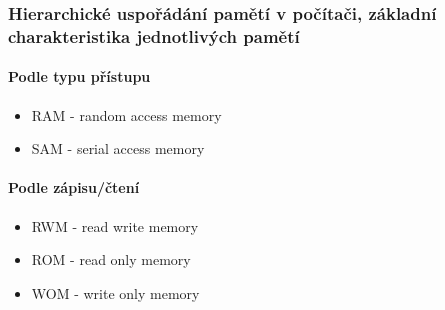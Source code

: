 \documentclass[10pt,a4paper]{article}
\begin{document}
\subsubsection{Hierarchické uspořádání pamětí v počítači, základní charakteristika jednotlivých pamětí}
\paragraph{Podle typu přístupu}
\begin{itemize}
\item RAM - random access memory
\item SAM - serial access memory
\end{itemize}

\paragraph{Podle zápisu/čtení}
\begin{itemize}
\item RWM - read write memory
\item ROM - read only memory
\item WOM - write only memory
\end{itemize}
\end{document}
